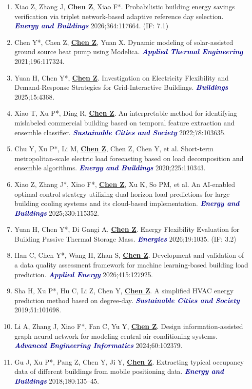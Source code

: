 \documentclass[11pt,a4paper]{article}
\newcommand{\me}[1]{\underline{\textbf{#1}}}
\newcommand{\journal}[1]{\textcolor{darkblue}{\textbf{\textit{#1}}}}
\begin{document}
\begin{enumerate}
\item Xiao Z, Zhang J, \me{Chen Z}, Xiao F*. Probabilistic building energy savings verification via triplet network-based adaptive reference day selection. \journal{Energy and Buildings} 2026;364:117664. (IF: 7.1)
\item Chen Y*, Chen Z, \me{Chen Z}, Yuan X. Dynamic modeling of solar-assisted ground source heat pump using Modelica. \journal{Applied Thermal Engineering} 2021;196:117324.
\item Yuan H, Chen Y*, \me{Chen Z}. Investigation on Electricity Flexibility and Demand-Response Strategies for Grid-Interactive Buildings. \journal{Buildings} 2025;15:4368.
\item Xiao T, Xu P*, Ding R, \me{Chen Z}. An interpretable method for identifying mislabeled commercial building based on temporal feature extraction and ensemble classifier. \journal{Sustainable Cities and Society} 2022;78:103635.
\item Chu Y, Xu P*, Li M, \me{Chen Z}, Chen Z, Chen Y, et al. Short-term metropolitan-scale electric load forecasting based on load decomposition and ensemble algorithms. \journal{Energy and Buildings} 2020;225:110343.
\item Xiao Z, Zhang J*, Xiao F*, \me{Chen Z}, Xu K, So PM, et al. An AI-enabled optimal control strategy utilizing dual-horizon load predictions for large building cooling systems and its cloud-based implementation. \journal{Energy and Buildings} 2025;330:115352.
\item Yuan H, Chen Y*, Di Gangi A, \me{Chen Z}. Energy Flexibility Evaluation for Building Passive Thermal Storage Mass. \journal{Energies} 2026;19:1035. (IF: 3.2)
\item Han C, Chen Y*, Wang H, Zhan S, \me{Chen Z}. Development and validation of a data quality assessment framework for machine learning-based building load prediction. \journal{Applied Energy} 2026;415:127925.
\item Sha H, Xu P*, Hu C, Li Z, Chen Y, \me{Chen Z}. A simplified HVAC energy prediction method based on degree-day. \journal{Sustainable Cities and Society} 2019;51:101698.
\item Li A, Zhang J, Xiao F*, Fan C, Yu Y, \me{Chen Z}. Design information-assisted graph neural network for modeling central air conditioning systems. \journal{Advanced Engineering Informatics} 2024;60:102379.
\item Gu J, Xu P*, Pang Z, Chen Y, Ji Y, \me{Chen Z}. Extracting typical occupancy data of different buildings from mobile positioning data. \journal{Energy and Buildings} 2018;180:135--45.
\end{enumerate}
\end{document}
